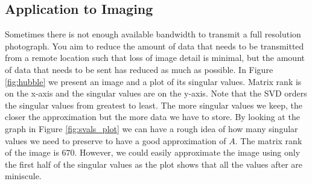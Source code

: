 \subsection*{Application to Imaging}

Sometimes there is not enough available bandwidth to transmit a full resolution photograph.
You aim to reduce the amount of data that needs to be transmitted from a remote location such that loss of image detail is minimal, but the amount of data that needs to be sent has reduced as much as possible.
In Figure \ref{fig:hubble} we present an image and a plot of its singular values.
Matrix rank is on the x-axis and the singular values are on the y-axis.
Note that the SVD orders the singular values from greatest to least.
The more singular values we keep, the closer the approximation but the more data we have to store.
By looking at the graph in Figure \ref{fig:svals_plot} we can have a rough idea of how many singular values we need to preserve to have a good approximation of $A$.
The matrix rank of the image is $670$.
However, we could easily approximate the image using only the first half of the singular values as the plot shows that all the values after are miniscule.



